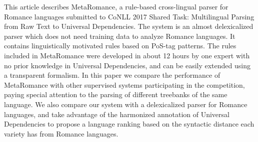 This article describes MetaRomance, a rule-based cross-lingual parser for Romance languages submitted to CoNLL 2017 Shared Task: Multilingual Parsing from Raw Text to Universal Dependencies. The system is an almost delexicalized parser which does not need training data to analyze Romance languages. It contains linguistically motivated rules based on PoS-tag patterns. The rules included in MetaRomance were developed in about 12 hours by one expert with no prior knowledge in Universal Dependencies, and can be easily extended using a transparent formalism. In this paper we compare the performance of MetaRomance with other supervised systems participating in the competition, paying special attention to the parsing of different treebanks of the same language. We also compare our system with a delexicalized parser for Romance languages, and take advantage of the harmonized annotation of Universal Dependencies to propose a language ranking based on the syntactic distance each variety has from Romance languages.
